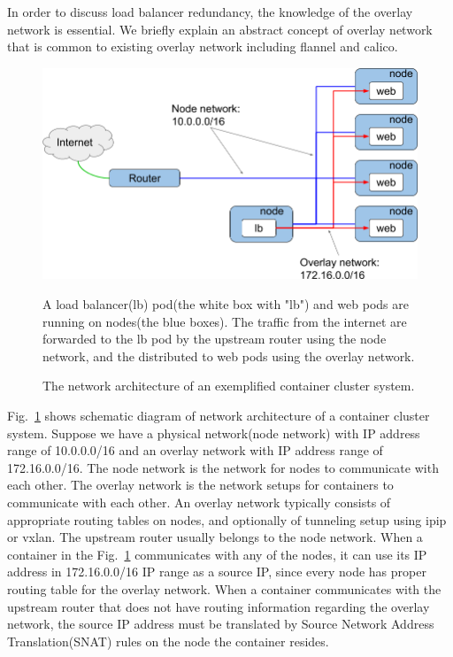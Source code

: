In order to discuss load balancer redundancy, the knowledge of the overlay network is essential.
We briefly explain an abstract concept of overlay network that is common to existing overlay network including flannel\cite{coreos_2018} and calico\cite{project_calico}.

\begin{figure}[tb]
\begin{center}
\includegraphics[width=\columnwidth]{Figs/overlay.png}
\end{center}
\caption{The network architecture of an exemplified container cluster system.}
A load balancer(lb) pod(the white box with "lb") and web pods are running on nodes(the blue boxes).
  The traffic from the internet are forwarded to the lb pod by the upstream router using the node network,
  and the distributed to web pods using the overlay network.
\label{fig:overlay}
\end{figure}

Fig.~\ref{fig:overlay} shows schematic diagram of network architecture of a container cluster system. 
Suppose we have a physical network(node network) with IP address range of 10.0.0.0/16 and an overlay network with IP address range of 172.16.0.0/16.
The node network is the network for nodes to communicate with each other.
The overlay network is the network setups for containers to communicate with each other.
An overlay network typically consists of appropriate routing tables on nodes, and optionally of tunneling setup using ipip or vxlan.
The upstream router usually belongs to the node network.
When a container in the Fig.~\ref{fig:overlay} communicates with any of the nodes, it can use its IP address in 172.16.0.0/16 IP range as a source IP, since every node has proper routing table for the overlay network.
When a container communicates with the upstream router that does not have routing information regarding the overlay network, the source IP address must be translated by Source Network Address Translation(SNAT) rules on the node the container resides.

